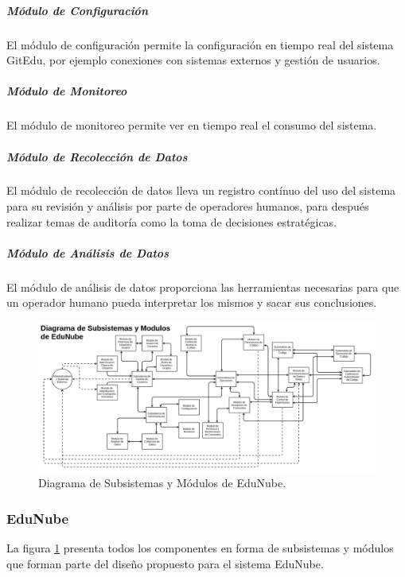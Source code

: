\subparagraph{Módulo de Configuración}
El módulo de configuración permite la configuración en tiempo real del sistema GitEdu, por ejemplo conexiones con sistemas externos y gestión de usuarios.

\subparagraph{Módulo de Monitoreo}
El módulo de monitoreo permite ver en tiempo real el consumo del sistema.

\subparagraph{Módulo de Recolección de Datos}
El módulo de recolección de datos lleva un registro contínuo del uso del sistema para su revisión y análisis por parte de operadores humanos, para después realizar temas de auditoría como la toma de decisiones estratégicas.

\subparagraph{Módulo de Análisis de Datos}
El módulo de análisis de datos proporciona las herramientas necesarias para que un operador humano pueda interpretar los mismos y sacar sus conclusiones.

\pagebreak

\begin{landscape}

	\begin{figure}
	  \begin{center}
	    \includegraphics[width=1.7\textwidth]{Figures/mod_en.png}
	  \end{center}
	  \caption{Diagrama de Subsistemas y Módulos de EduNube.}
	  \label{mod_en}
	\end{figure}

\end{landscape}

\subsubsection{EduNube}

La figura \ref{mod_en} presenta todos los componentes en forma de subsistemas y módulos que forman parte del diseño propuesto para el sistema EduNube.

